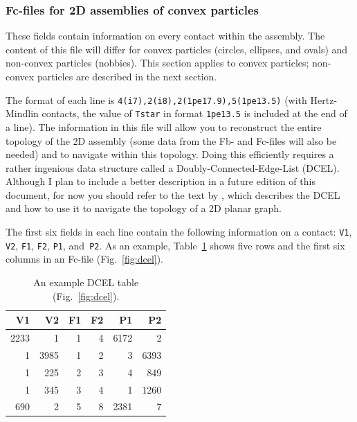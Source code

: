 \documentclass[letterpaper,11pt]{article}
\begin{document}
\subsubsection{Fc-files for 2D assemblies of convex particles}\label{sec:f3files}
These fields contain information on every contact within the assembly.
The content of this file will differ for convex particles (circles,
ellipses, and ovals) and non-convex particles (nobbies).
This section applies to convex particles; non-convex particles
are described in the next section.
\par
The format of each line is \texttt{4(i7),2(i8),2(1pe17.9),5(1pe13.5)}
(with Hertz-Mindlin contacts, the value of \texttt{Tstar} in 
format \texttt{1pe13.5} is included at the end of a line).
The information in this file will allow you to reconstruct the
entire topology of the 2D assembly (some data from the Fb- and Fc-files
will also be needed) and to navigate within this topology.
Doing this efficiently requires a rather ingenious
data structure called a Doubly-Connected-Edge-List
(DCEL).
Although I plan to include a better description in a future edition 
of this document,
for now you should refer to the text by ,
which describes the DCEL and how to use it to navigate 
the topology of a 2D planar graph.
\par
The first six fields in each line contain the following information
on a contact:
\texttt{V1}, \texttt{V2}, \texttt{F1}, \texttt{F2}, \texttt{P1},
and~\texttt{P2}.
As an example,
Table~\ref{table:dcel} shows five rows 
and the first six columns in an Fc-file
(Fig.~\ref{fig:dcel}).
\begin{table}
\centering
\begin{tabular}{rrrrrr}
\hline
\hline
V1 & V2 & F1 & F2 & P1 & P2 \\
\hline
2233 &    1 & 1 &  4 & 6172 &    2 \\
   1 & 3985 & 1 &  2 &    3 & 6393 \\
   1 &  225 & 2 &  3 &    4 &  849 \\
   1 &  345 & 3 &  4 &    1 & 1260 \\
 690 &    2 & 5 &  8 & 2381 &    7 \\
\hline
\hline
\end{tabular}
\caption{An example DCEL table (Fig.~\ref{fig:dcel}).}
\label{table:dcel}
\end{table}
%
\end{document}
